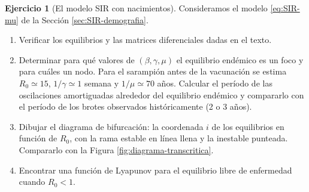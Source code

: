 \documentclass[12pt, a4paper]{amsbook}
\theoremstyle{remark}
\theoremstyle{definition}
\newtheorem{ejer}[teo]{Ejercicio}
\numberwithin{section}{chapter}
\numberwithin{subsection}{section}
\numberwithin{equation}{section}
\numberwithin{figure}{chapter}
\begin{document}
\begin{ejer}[El modelo SIR con nacimientos]
Consideramos el modelo \eqref{eq:SIR-mu} de la Sección \ref{sec:SIR-demografia}.
\begin{enumerate}
\item Verificar los equilibrios y las matrices diferenciales dadas en el texto.
\item Determinar para qué valores de $(\beta,\gamma,\mu)$ el equilibrio endémico es un foco y para cuáles un nodo. Para el sarampión antes de la vacunación se estima $R_0\simeq 15$, $1/\gamma\simeq 1$ semana y $1/\mu\simeq 70$ años. Calcular el período de las oscilaciones amortiguadas alrededor del equilibrio endémico y compararlo con el período de los brotes observados históricamente (2 o 3 años).
\item Dibujar el diagrama de bifurcación: la coordenada $i$ de los equilibrios en función de $R_0$, con la rama estable en línea llena y la inestable punteada. Compararlo con la Figura \ref{fig:diagrama-transcritica}.
\item Encontrar una función de Lyapunov para el equilibrio libre de enfermedad cuando $R_0<1$.
\end{enumerate}
\end{ejer}
\end{document}
